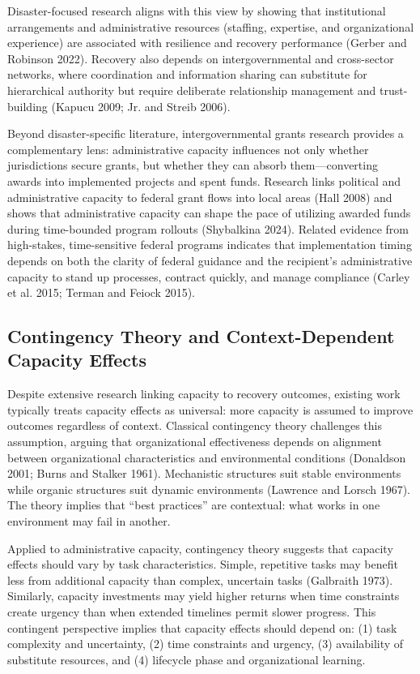 \documentclass[
  12pt,
  letterpaper,
]{article}
\begin{document}
Disaster-focused research aligns with this view by showing that
institutional arrangements and administrative resources (staffing,
expertise, and organizational experience) are associated with resilience
and recovery performance (Gerber and Robinson 2022). Recovery also
depends on intergovernmental and cross-sector networks, where
coordination and information sharing can substitute for hierarchical
authority but require deliberate relationship management and
trust-building (Kapucu 2009; Jr. and Streib 2006).

Beyond disaster-specific literature, intergovernmental grants research
provides a complementary lens: administrative capacity influences not
only whether jurisdictions secure grants, but whether they can absorb
them---converting awards into implemented projects and spent funds.
Research links political and administrative capacity to federal grant
flows into local areas (Hall 2008) and shows that administrative
capacity can shape the pace of utilizing awarded funds during
time-bounded program rollouts (Shybalkina 2024). Related evidence from
high-stakes, time-sensitive federal programs indicates that
implementation timing depends on both the clarity of federal guidance
and the recipient's administrative capacity to stand up processes,
contract quickly, and manage compliance (Carley et al. 2015; Terman and
Feiock 2015).

\subsection{Contingency Theory and Context-Dependent Capacity
Effects}\label{contingency-theory-and-context-dependent-capacity-effects}

Despite extensive research linking capacity to recovery outcomes,
existing work typically treats capacity effects as universal: more
capacity is assumed to improve outcomes regardless of context. Classical
contingency theory challenges this assumption, arguing that
organizational effectiveness depends on alignment between organizational
characteristics and environmental conditions (Donaldson 2001; Burns and
Stalker 1961). Mechanistic structures suit stable environments while
organic structures suit dynamic environments (Lawrence and Lorsch 1967).
The theory implies that ``best practices'' are contextual: what works in
one environment may fail in another.

Applied to administrative capacity, contingency theory suggests that
capacity effects should vary by task characteristics. Simple, repetitive
tasks may benefit less from additional capacity than complex, uncertain
tasks (Galbraith 1973). Similarly, capacity investments may yield higher
returns when time constraints create urgency than when extended
timelines permit slower progress. This contingent perspective implies
that capacity effects should depend on: (1) task complexity and
uncertainty, (2) time constraints and urgency, (3) availability of
substitute resources, and (4) lifecycle phase and organizational
learning.
\end{document}
